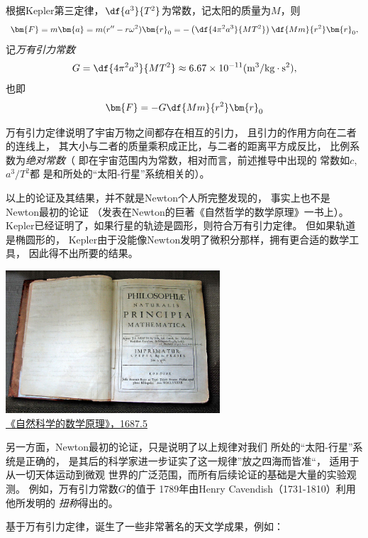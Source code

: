 \begin{shaded}
	根据Kepler第三定律，$\df{a^3}{T^2}$为常数，记太阳的质量为$M$，则
	$$\bm{F}=m\bm{a}=m(r''-r\omega^2)\bm{r}_0
	=-\left(\df{4\pi^2a^3}{MT^2}\right)\df{Mm}{r^2}\bm{r}_0,$$
	记{\it 万有引力常数}
	$$G=\df{4\pi^2a^3}{MT^2}\approx 6.67\times 10^{-11}
	(\mbox{m}^3/\mbox{kg}\cdot\mbox{s}^2),
	$$
	也即
	$$\bm{F}=-G\df{Mm}{r^2}\bm{r}_0$$
	
	
	万有引力定律说明了宇宙万物之间都存在相互的引力，
	且引力的作用方向在二者的连线上，
	其大小与二者的质量乘积成正比，与二者的距离平方成反比，
	比例系数为{\it 绝对常数}（
	即在宇宙范围内为常数，相对而言，前述推导中出现的
	常数如$c$,$a^3/T^2$都
	是和所处的“太阳-行星”系统相关的）。
	
	
	以上的论证及其结果，并不就是Newton个人所完整发现的，
	事实上也不是Newton最初的论证
	（发表在Newton的巨著《自然哲学的数学原理》一书上）。
	Kepler已经证明了，如果行星的轨迹是圆形，则符合万有引力定律。
	但如果轨道是椭圆形的，
	Kepler由于没能像Newton发明了微积分那样，拥有更合适的数学工具，
	因此得不出所要的结果。

	\begin{center}
		\includegraphics[width=0.6\textwidth]
		{./images/ch02/800px-NewtonsPrincipia.jpg}\\
		{\kaishu \href{https://en.wikipedia.org/wiki/Philosophiæ_Naturalis_Principia_Mathematica}{《自然科学的数学原理》，1687.5}}
	\end{center}
	
	另一方面，Newton最初的论证，只是说明了以上规律对我们
	所处的“太阳-行星”系统是正确的，
	是其后的科学家进一步证实了这一规律”放之四海而皆准“，
	适用于从一切天体运动到微观
	世界的广泛范围，而所有后续论证的基础是大量的实验观测。
	例如，万有引力常数$G$的值于
	1789年由Henry Cavendish（1731-1810）利用他所发明的
	{\it 扭称}得出的。
	
	基于万有引力定律，诞生了一些非常著名的天文学成果，例如：
	

\end{shaded}
